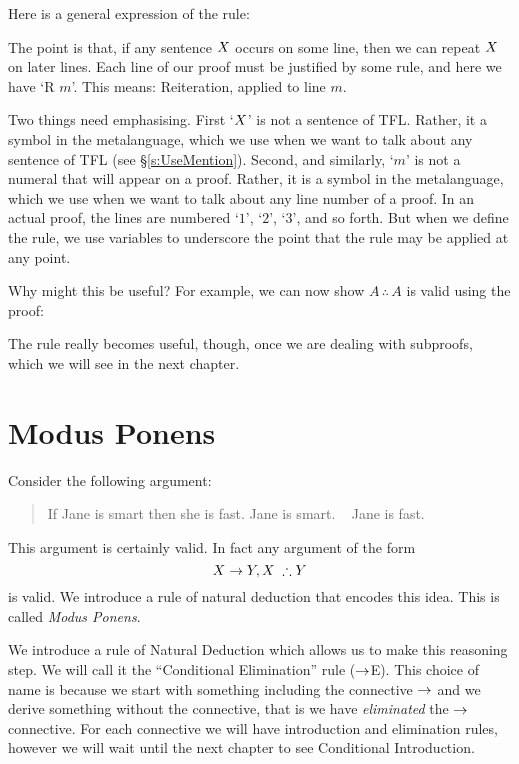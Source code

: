 Here is a general expression of the rule:
\begin{highlighted}
\begin{fitchproof}
	\ellipsesline
	\ellipsesline
	 
\end{fitchproof}
\end{highlighted}
The point is that, if any sentence $X$ occurs on some line, then we can repeat $X$ on later lines. Each line of our proof must be justified by some rule, and here we have `R $m$'. This means: Reiteration, applied to line $m$.

Two things need emphasising. First `$X$' is not a sentence of TFL. Rather, it a symbol in the metalanguage, which we use when we want to talk about any sentence of TFL (see \S\ref{s:UseMention}). Second, and similarly, `$m$' is not a numeral that will appear on a proof. Rather, it is a symbol in the metalanguage, which we use when we want to talk about any line number of a proof. In an actual proof, the lines are numbered `$1$', `$2$', `$3$', and so forth. But when we define the rule, we use variables to underscore the point that the rule may be applied at any point.

Why might this be useful? For example, we can now show $A\,\therefore\,A$ is valid using the proof:
\begin{fitchproof}
\end{fitchproof}
The rule really becomes useful, though, once we are dealing with subproofs, which we will see in the next chapter.

\section{Modus Ponens}
Consider the following argument:
	\begin{quote}
		If Jane is smart then she is fast. Jane is smart. \therefore~ Jane is fast.
	\end{quote}
This argument is certainly valid.
In fact any argument of the form $$\metaX\eif \metaY,\metaX\;\therefore\metaY$$ is valid. We introduce a rule of natural deduction that encodes this idea. This is
called \emph{Modus Ponens}.

We introduce a rule of Natural Deduction which allows us to make this reasoning step. We will call it the ``Conditional Elimination'' rule ($\rightarrow$E). This choice of name is because we {start} with something including the connective $\rightarrow$ and we derive something without the connective, that is we have \emph{eliminated} the $\rightarrow$ connective. For each connective we will have introduction and elimination rules, however we will wait until the next chapter to see Conditional Introduction.

